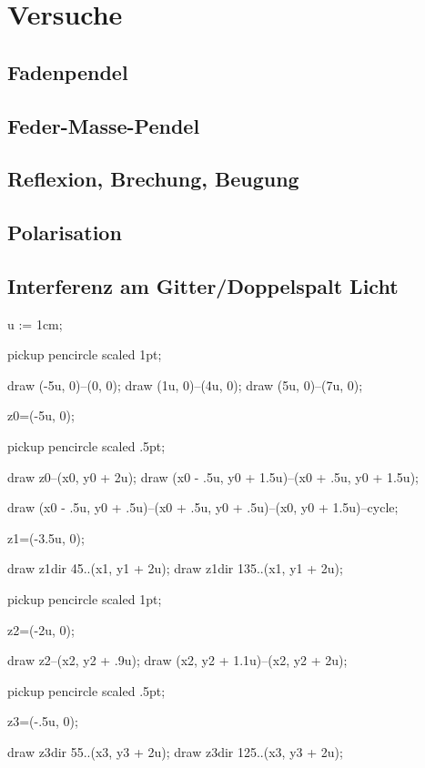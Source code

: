 \section{Versuche}
\subsection{Fadenpendel}
\subsection{Feder-Masse-Pendel}
\subsection{Reflexion, Brechung, Beugung}
\stopsubsection
\subsection{Polarisation}
\subsection{Interferenz am Gitter/Doppelspalt Licht}

\startMPpage

u := 1cm;

pickup pencircle scaled 1pt;

draw (-5u, 0)--(0, 0);
draw (1u, 0)--(4u, 0);
draw (5u, 0)--(7u, 0);

z0=(-5u, 0);

pickup pencircle scaled .5pt;

draw z0--(x0, y0 + 2u);
draw (x0 - .5u, y0 + 1.5u)--(x0 + .5u, y0 + 1.5u);

draw (x0 - .5u, y0 + .5u)--(x0 + .5u, y0 + .5u)--(x0, y0 + 1.5u)--cycle;


z1=(-3.5u, 0);

draw z1{dir 45}..(x1, y1 + 2u);
draw z1{dir 135}..(x1, y1 + 2u);

pickup pencircle scaled 1pt;

z2=(-2u, 0);

draw z2--(x2, y2 + .9u);
draw (x2, y2 + 1.1u)--(x2, y2 + 2u);

pickup pencircle scaled .5pt;

z3=(-.5u, 0);

draw z3{dir 55}..(x3, y3 + 2u);
draw z3{dir 125}..(x3, y3 + 2u);

